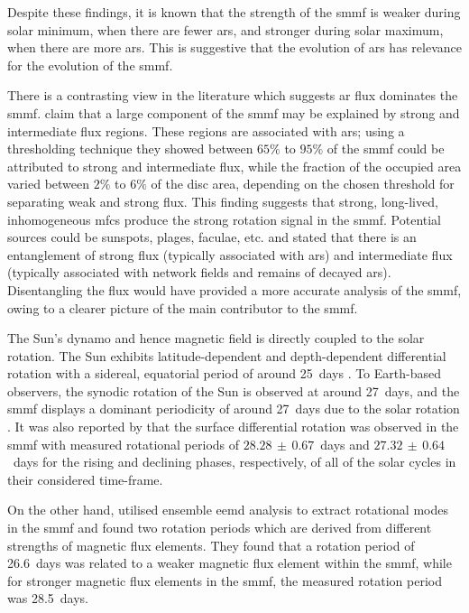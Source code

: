 Despite these findings, it is known that the strength of the \gls{smmf} is weaker during solar minimum, when there are fewer \glspl{ar}, and stronger during solar maximum, when there are more \glspl{ar}. This is suggestive that the evolution of \glspl{ar} has relevance for the evolution of the \gls{smmf}.

There is a contrasting view in the literature which suggests \gls{ar} flux dominates the \gls{smmf}. \citet{kutsenko_contribution_2017} claim that a large component of the \gls{smmf} may be explained by strong and intermediate flux regions. These regions are associated with \glspl{ar}; using a thresholding technique they showed between $65 \%$ to $95 \%$ of the \gls{smmf} could be attributed to strong and intermediate flux, while the fraction of the occupied area varied between $2 \%$ to $6 \%$ of the disc area, depending on the chosen threshold for separating weak and strong flux. This finding suggests that strong, long-lived, inhomogeneous \gls{mfc}s produce the strong rotation signal in the \gls{smmf}. Potential sources could be sunspots, plages, faculae, etc. and \citet{kutsenko_contribution_2017} stated that there is an entanglement of strong flux (typically associated with \glspl{ar}) and intermediate flux (typically associated with network fields and remains of decayed \glspl{ar}). Disentangling the flux would have provided a more accurate analysis of the \gls{smmf}, owing to a clearer picture of the main contributor to the \gls{smmf}.

The Sun's dynamo and hence magnetic field is directly coupled to the solar rotation. The Sun exhibits latitude-dependent and depth-dependent differential rotation with a sidereal, equatorial period of around 25~days \citep{howe_solar_2009}. To Earth-based observers, the synodic rotation of the Sun is observed at around 27~days, and the \gls{smmf} displays a dominant periodicity of around 27~days due to the solar rotation \citep{chaplin_studies_2003, xie_temporal_2017, bose_variability_2018}. It was also reported by \citet{xie_temporal_2017} that the surface differential rotation was observed in the \gls{smmf} with measured rotational periods of $28.28 \, \pm \, 0.67$~days and $27.32 \, \pm \, 0.64$~days for the rising and declining phases, respectively, of all of the solar cycles in their considered time-frame.

On the other hand, \citet{xiang_ensemble_2016} utilised ensemble \gls{eemd} analysis to extract rotational modes in the \gls{smmf} and found two rotation periods which are derived from different strengths of magnetic flux elements. They found that a rotation period of 26.6~days was related to a weaker magnetic flux element within the \gls{smmf}, while for stronger magnetic flux elements in the \gls{smmf}, the measured rotation period was 28.5~days.

